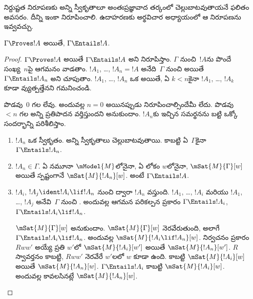 \documentclass[../../../include/open-logic-section]{subfiles}
\begin{document}


\begin{editorial}
  నిర్దుష్టత నిరూపణకు అన్ని స్వీకృతాలూ అంతఃప్రజ్ఞావాద
  తర్కంలో చెల్లుబాటవుతాయనే ఫలితం అవసరం. దీన్ని
  ఇంకా నిరూపించాలి. ఉదాహరణకు అర్థవిచార అధ్యాయంలో
  ఆ నిరూపణను ఇవ్వవచ్చు.
\end{editorial}

\begin{thm}[నిర్దుష్టత]
  $\Gamma \Proves !A$ అయితే, $ \Gamma \Entails !A$.
\end{thm}

\begin{proof}
  $\Gamma \Proves !A$ అయితే $\Gamma \Entails !A$
  అని నిరూపిస్తాం. $\Gamma$ నుంచి~$!A$ను పొందే
   
  సంఖ్య~$n$పై ఆగమనం వాడతాం.
  $!A_1$, \dots, $!A_n = !A$ అనేది~$\Gamma$ నుంచి
   అయితే $\Gamma
  \Entails !A_n$ అని చూపుతాం. $!A_1$, \dots, $!A_n$
  ఒక  అయితే, ఏ $k<n$కైనా
  $!A_1$, \dots, $!A_k$ కూడా వ్యుత్పత్తేనని గమనించండి.

  పొడవు~$0$ గల 
  లేవు. అందువల్ల $n=0$ అయినప్పుడు నిరూపించాల్సిందేమీ లేదు.
  పొడవు~$<n$ గల అన్ని 
  ప్రతిపాదన వర్తిస్తుందని అనుకుందాం. $!A_n$కు ఇచ్చిన
  సమర్థనను బట్టి ఒక్కో సందర్భాన్ని పరిశీలిస్తాం.

  \begin{enumerate}
  \item $!A_n$ ఒక స్వీకృతం. అన్ని స్వీకృతాలు
    చెల్లుబాటవుతాయి. కాబట్టి ఏ~$\Gamma$కైనా
    $\Gamma \Entails !A_n$.
  \item $!A_n \in \Gamma$. ఏ నమూనా
    $\mModel{M}$లోనైనా, ఏ లోకం $w$లోనైనా,
    $\mSat{M}{\Gamma}[w]$ అయితే స్పష్టంగానే $\mSat{M}{!A_n}[w]$.
    అంటే $\Gamma \Entails !A$.
  \item $!A_i$, $!A_j \ident !A_i \lif !A_n$ నుంచి
    \MP{} ద్వారా $!A_n$ వస్తుంది. $!A_1$, \dots,
    $!A_i$ మరియు $!A_1$, \dots, $!A_j$
    అనేవి~$\Gamma$ నుంచి .
    అందువల్ల ఆగమన పరికల్పన ప్రకారం $\Gamma
    \Entails !A_i$, $\Gamma \Entails !A_i \lif !A_n$.

    $\mSat{M}{\Gamma}[w]$ అనుకుందాం.
    $\mSat{M}{\Gamma}[w]$ నెరవేరుతుంది, అలాగే
    $\Gamma \Entails !A_i \lif !A_n$. అందువల్ల
    $\mSat{M}{!A_i \lif
      !A_n}[w]$. నిర్వచనం ప్రకారం
    $Rww'$ అయ్యే ప్రతి $w'$లో
    $\mSat{M}{!A_i}[w']$ అయితే $\mSat{M}{!A_n}[w']$.
    $R$ స్వావర్తనం కాబట్టి, $Rww'$ నెరవేరే
    $w'$లలో $w$ కూడా ఉంది. కాబట్టి
    $\mSat{M}{!A_i}[w]$ అయితే $\mSat{M}{!A_n}[w]$.
    $\Gamma \Entails !A_i$ కాబట్టి
    $\mSat{M}{!A_i}[w]$. అందువల్ల కావలసినట్లే
    $\mSat{M}{!A_n}[w]$.
  \end{enumerate}
\end{proof}
\end{document}
